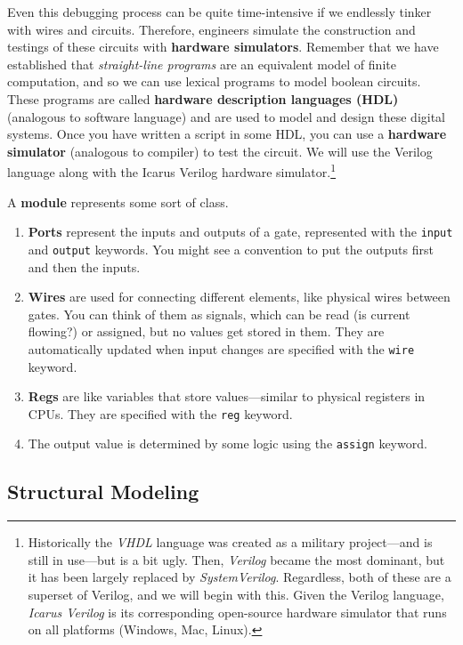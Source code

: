   Even this debugging process can be quite time-intensive if we endlessly tinker with wires and circuits. Therefore, engineers simulate the construction and testings of these circuits with \textbf{hardware simulators}. Remember that we have established that \textit{straight-line programs} are an equivalent model of finite computation, and so we can use lexical programs to model boolean circuits. These programs are called \textbf{hardware description languages (HDL)} (analogous to software language) and are used to model and design these digital systems. Once you have written a script in some HDL, you can use a \textbf{hardware simulator} (analogous to compiler) to test the circuit. We will use the Verilog language along with the Icarus Verilog hardware simulator.\footnote{Historically the \textit{VHDL} language was created as a military project---and is still in use---but is a bit ugly.  Then, \textit{Verilog} became the most dominant, but it has been largely replaced by \textit{SystemVerilog}. Regardless, both of these are a superset of Verilog, and we will begin with this. Given the Verilog language, \textit{Icarus Verilog} is its corresponding open-source hardware simulator that runs on all platforms (Windows, Mac, Linux).}

  \begin{definition}[Module]
    A \textbf{module} represents some sort of class. 
    \begin{enumerate}
      \item \textbf{Ports} represent the inputs and outputs of a gate, represented with the \texttt{input} and \texttt{output} keywords. You might see a convention to put the outputs first and then the inputs. 
      \item \textbf{Wires} are used for connecting different elements, like physical wires between gates. You can think of them as signals, which can be read (is current flowing?) or assigned, but no values get stored in them. They are automatically updated when input changes are specified with the \texttt{wire} keyword. 
      \item \textbf{Regs} are like variables that store values---similar to physical registers in CPUs. They are specified with the \texttt{reg} keyword. 
      \item The output value is determined by some logic using the \texttt{assign} keyword. 
    \end{enumerate}
  \end{definition}

\subsection{Structural Modeling}
  
